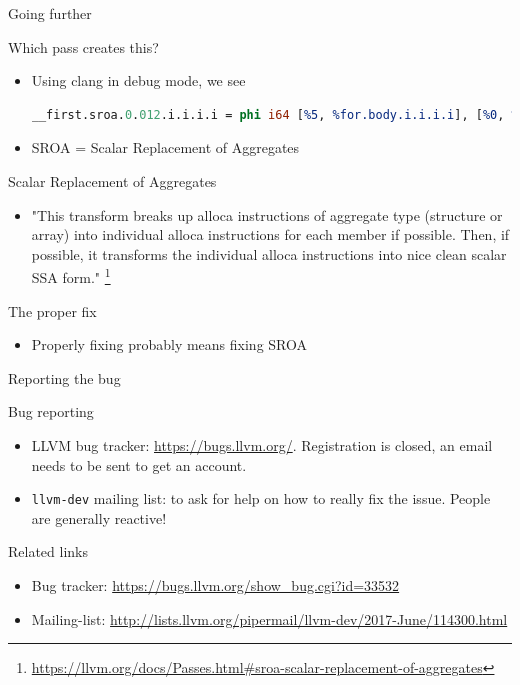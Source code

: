 \begin{frame}[fragile]{Going further}
  \begin{block}{Which pass creates this?}
    \begin{itemize}
      \item Using clang in debug mode, we see
        \begin{lstlisting}[language=llvm]
__first.sroa.0.012.i.i.i.i = phi i64 [%5, %for.body.i.i.i.i], [%0, %for.body.preheader.i.i.i.i]
        \end{lstlisting}
      \item SROA = Scalar Replacement of Aggregates
    \end{itemize}
  \end{block}

  \begin{block}{Scalar Replacement of Aggregates}
    \begin{itemize}
      \item "This transform breaks up alloca instructions of aggregate type
        (structure or array) into individual alloca instructions for each
        member if possible. Then, if possible, it transforms the individual
        alloca instructions into nice clean scalar SSA form."
        \footnote{\url{https://llvm.org/docs/Passes.html\#sroa-scalar-replacement-of-aggregates}}
    \end{itemize}
  \end{block}

  \begin{block}{The proper fix}
    \begin{itemize}
      \item Properly fixing probably means fixing SROA
    \end{itemize}
  \end{block}
\end{frame}

\begin{frame}{Reporting the bug}
  \begin{block}{Bug reporting}
    \begin{itemize}
      \item LLVM bug tracker: \url{https://bugs.llvm.org/}. Registration is
        closed, an email needs to be sent to get an account.
      \item {\tt llvm-dev} mailing list: to ask for help on how to really fix
        the issue. People are generally reactive!
    \end{itemize}
  \end{block}

  \begin{alertblock}{Related links}
    \begin{itemize}
      \item Bug tracker: \url{https://bugs.llvm.org/show_bug.cgi?id=33532}
      \item Mailing-list: \url{http://lists.llvm.org/pipermail/llvm-dev/2017-June/114300.html}
    \end{itemize}
  \end{alertblock}

\end{frame}

